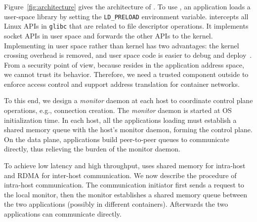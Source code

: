 
Figure~\ref{fig:architecture} gives the architecture of \sys. To use \sys, an application loads a user-space library \libipc{} by setting the \texttt{LD\_PRELOAD} environment variable. \libipc{} intercepts all Linux APIs in \texttt{glibc} that are related to file descriptor operations. It implements socket APIs in user space and forwards the other APIs to the kernel.
Implementing \sys in user space rather than kernel has two advantages: the kernel crossing overhead is removed, and user space code is easier to debug and deploy~\cite{andromeda}.
From a security point of view, because \libipc{} resides in the application address space, we cannot trust its behavior. Therefore, we need a trusted component outside \libipc{} to enforce access control and support address translation for container networks.

To this end, we design a \emph{monitor} daemon at each host to coordinate control plane operations, e.g., connection creation. The \emph{monitor} daemon is started at OS initialization time. In each host, all the applications loading \libipc{} must establish a shared memory queue with the host's monitor daemon, forming the control plane. On the data plane, applications build peer-to-peer queues to communicate directly, thus relieving the burden of the monitor daemon.  




To achieve low latency and high throughput, \sys{} uses shared memory for intra-host and RDMA for inter-host communication. We now describe the procedure of intra-host communication. The communication initiator first sends a request to the local monitor, then the monitor establishes a shared memory queue between the two applications (possibly in different containers). Afterwards the two applications can communicate directly.  



